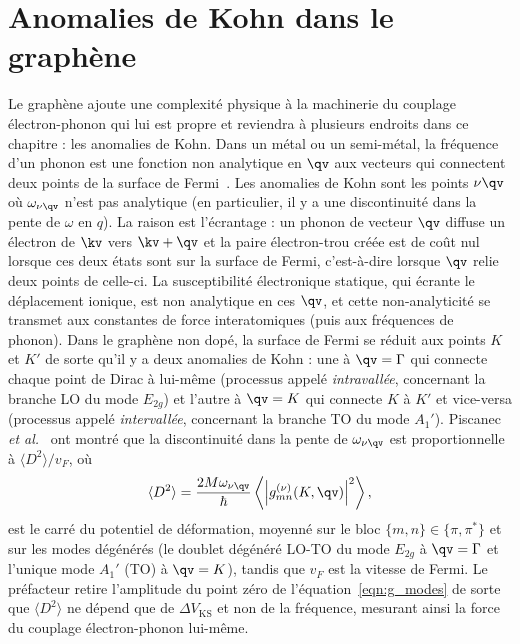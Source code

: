 \section{Anomalies de Kohn dans le graphène}\label{sec:g_kohn}

Le graphène ajoute une complexité physique à la machinerie du couplage électron-phonon qui lui est propre et reviendra à plusieurs endroits dans ce chapitre : les anomalies de Kohn. Dans un métal ou un semi-métal, la fréquence d'un phonon est une fonction non analytique en $\qv$ aux vecteurs qui connectent deux points de la surface de Fermi~\cite{kohnImageFermiSurface1959}. Les anomalies de Kohn sont les points $\nu\qv$ où $\omega_{\nu\qv}$ n'est pas analytique (en particulier, il y a une discontinuité dans la pente de $\omega$ en $q$). La raison est l'écrantage : un phonon de vecteur $\qv$ diffuse un électron de $\kv$ vers $\kv+\qv$ et la paire électron-trou créée est de coût nul lorsque ces deux états sont sur la surface de Fermi, c'est-à-dire lorsque $\qv$ relie deux points de celle-ci. La susceptibilité électronique statique, qui écrante le déplacement ionique, est non analytique en ces $\qv$, et cette non-analyticité se transmet aux constantes de force interatomiques (puis aux fréquences de phonon). Dans le graphène non dopé, la surface de Fermi se réduit aux points $K$ et $K'$ de sorte qu'il y a deux anomalies de Kohn : une à $\qv=\Gamma$ qui connecte chaque point de Dirac à lui-même (processus appelé \textit{intravallée}, concernant la branche LO du mode $E_{2g}$) et l'autre à $\qv=K$ qui connecte $K$ à $K'$ et vice-versa (processus appelé \textit{intervallée}, concernant la branche TO du mode $A_1'$). Piscanec \textit{et al.}~\cite{piscanecKohnAnomaliesElectronPhonon2004} ont montré que la discontinuité dans la pente de $\omega_{\nu\qv}$ est proportionnelle à $\langle D^2\rangle/v_F$, où
\begin{equation}
    \langle D^2\rangle = \frac{2M\omega_{\nu\qv}}{\hbar}\left\langle\left|g^{(\nu)}_{mn}(K,\qv)\right|^2\right\rangle,\label{eqn:D2}
\end{equation}
est le carré du potentiel de déformation, moyenné sur le bloc $\{m,n\}\in\{\pi,\pi^*\}$ et sur les modes dégénérés (le doublet dégénéré LO-TO du mode $E_{2g}$ à $\qv=\Gamma$ et l'unique mode $A_1'$ (TO) à $\qv=K$), tandis que $v_F$ est la vitesse de Fermi. Le préfacteur retire l'amplitude du point zéro de l'équation~\eqref{eqn:g_modes} de sorte que $\langle D^2\rangle$ ne dépend que de $\Delta V_\text{KS}$ et non de la fréquence, mesurant ainsi la force du couplage électron-phonon lui-même.

